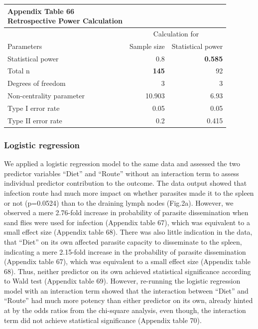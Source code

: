 \documentclass[
  12pt,
  letterpaper,
]{article}
\begin{document}
\begin{longtable}{l|rr}
\caption*{
{\large \textbf{Appendix Table 66}} \\ 
{\small \textbf{Retrospective Power Calculation}}
} \\ 
\toprule
\multicolumn{1}{l}{} & \multicolumn{2}{c}{Calculation for} \\ 
\cmidrule(lr){2-3}
\multicolumn{1}{l}{Parameters} & Sample size & Statistical power \\ 
\midrule\addlinespace[2.5pt]
Statistical power & 0.8 & \textbf{0.585} \\ 
Total n & \textbf{145} & 92 \\ 
Degrees of freedom & 3 & 3 \\ 
Non-centrality parameter & 10.903 & 6.93 \\ 
Type I error rate & 0.05 & 0.05 \\ 
Type II error rate & 0.2 & 0.415 \\ 
\bottomrule
\end{longtable}

\subsubsection{Logistic regression}\label{logistic-regression-1}

We applied a logistic regression model to the same data and assessed the two predictor variables ``Diet'' and ``Route'' without an interaction term to assess individual predictor contribution to the outcome. The data output showed that infection route had much more impact on whether parasites made it to the spleen or not (p=0.0524) than to the draining lymph nodes (Fig.2a). However, we observed a mere 2.76-fold increase in probability of parasite dissemination when sand flies were used for infection (Appendix table 67), which was equivalent to a small effect size (Appendix table 68). There was also little indication in the data, that ``Diet'' on its own affected parasite capacity to disseminate to the spleen, indicating a mere 2.15-fold increase in the probability of parasite dissemination (Appendix table 67), which was equivalent to a small effect size (Appendix table 68). Thus, neither predictor on its own achieved statistical significance according to Wald test (Appendix table 69). However, re-running the logistic regression model with an interaction term showed that the interaction between ``Diet'' and ``Route'' had much more potency than either predictor on its own, already hinted at by the odds ratios from the chi-square analysis, even though, the interaction term did not achieve statistical significance (Appendix table 70).
\end{document}

